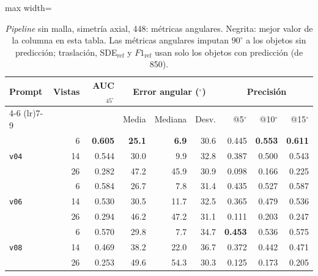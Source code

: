 
\begin{table}[htbp]
\centering
\caption{\textit{Pipeline} sin malla, simetría axial, 448: métricas angulares. Negrita: mejor valor de la columna en esta tabla. Las métricas angulares imputan $90^\circ$ a los objetos sin predicción; traslación, SDE$_{\mathrm{ref}}$ y $F1_{\mathrm{ref}}$ usan solo los objetos con predicción (de 850).}
\label{tab:axis_448_angular}
\begin{adjustbox}{max width=\textwidth}
\begin{tabular}{lrrrrrrrr}
\toprule
\multirow{2}{*}{Prompt} & \multirow{2}{*}{Vistas} & \multirow{2}{*}{AUC$_{45^\circ}$} & \multicolumn{3}{c}{Error angular ($^\circ$)} & \multicolumn{3}{c}{Precisión} \\
\cmidrule(lr){4-6} \cmidrule(lr){7-9}
 &  &  & Media & Mediana & Desv. & @5$^\circ$ & @10$^\circ$ & @15$^\circ$ \\
\midrule
\multirow{3}{*}{\texttt{v04}} & 6 & \textbf{0.605} & \textbf{25.1} & \textbf{6.9} & 30.6 & 0.445 & \textbf{0.553} & \textbf{0.611} \\
 & 14 & 0.544 & 30.0 & 9.9 & 32.8 & 0.387 & 0.500 & 0.543 \\
 & 26 & 0.282 & 47.2 & 45.9 & 30.9 & 0.098 & 0.166 & 0.225 \\
\midrule
\multirow{3}{*}{\texttt{v06}} & 6 & 0.584 & 26.7 & 7.8 & 31.4 & 0.435 & 0.527 & 0.587 \\
 & 14 & 0.530 & 30.5 & 11.7 & 32.5 & 0.365 & 0.479 & 0.536 \\
 & 26 & 0.294 & 46.2 & 47.2 & 31.1 & 0.111 & 0.203 & 0.247 \\
\midrule
\multirow{3}{*}{\texttt{v08}} & 6 & 0.570 & 29.8 & 7.7 & 34.7 & \textbf{0.453} & 0.536 & 0.575 \\
 & 14 & 0.469 & 38.2 & 22.0 & 36.7 & 0.372 & 0.442 & 0.471 \\
 & 26 & 0.253 & 49.6 & 54.3 & 30.3 & 0.125 & 0.173 & 0.205 \\
\bottomrule
\end{tabular}
\end{adjustbox}
\end{table}

